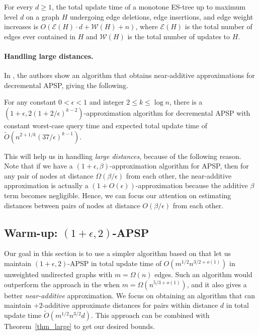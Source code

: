 \begin{lemma}\label{lm:ES-tree}
    For every $d \geq 1$, the total update time of a monotone ES-tree up to maximum level $d$ on a graph $H$ undergoing edge deletions, edge insertions, and edge weight increases is $O(\mathcal E(H)\cdot d+\mathcal W(H)+n)$, where $\mathcal E(H)$ is the total number of edges ever contained in $H$ and $\mathcal W(H)$ is the total number of updates to $H$.
\end{lemma}



\paragraph{Handling large distances.} 

In \cite{HKN14}, the authors show an algorithm that obtains near-additive approximations for decremental APSP, giving the following.

\begin{theorem}\label{thm_large}
For any constant $0 < \epsilon < 1$ and integer $2 \leq k \leq \log{n}$, there is a $(1+\epsilon, 2(1+2/\epsilon)^{k-2})$-approximation algorithm for decremental APSP with constant worst-case query time and expected total update time of $\tilde{O}(n^{2+1/k} (37/\epsilon)^{k-1})$.
\end{theorem}

This will help us in handling \emph{large distances}, because of the following reason. Note that if we have a $(1+\epsilon,\beta)$-approximation algorithm for APSP, then for any pair of nodes at distance $\Omega(\beta/\epsilon)$ from each other, the near-additive approximation is actually a $(1+O(\epsilon))$-approximation because the additive $\beta$ term becomes negligible. Hence, we can focus our attention on estimating distances between pairs of nodes at distance $O(\beta/\epsilon)$ from each other.


\subsection{Warm-up: \texorpdfstring{$(1+\epsilon,2)$}{(1+epsilon,2)}-APSP }\label{sec:additive_warm_up}

Our goal in this section is to use a simpler algorithm based on \cite{DHZ00} that let us maintain $(1+\epsilon,2)$-APSP in total update time of $O(m^{1/2}n^{3/2+o(1)})$ in unweighted undirected graphs with $m=\Omega(n)$ edges. Such an algorithm would outperform the approach in the  when $m= \Omega( n^{5/3+o(1)} )$, and it also gives a better \emph{near-additive} approximation. We focus on obtaining an algorithm that can maintain $+2$-additive approximate distances for pairs within distance $d$ in total update time $\tilde{O}(m^{1/2}n^{3/2}d)$. This approach can be combined with Theorem~\ref{thm_large} to get our desired bounds. 

